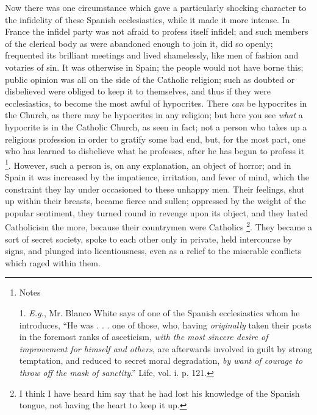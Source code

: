 Now there was one circumstance which gave a
particularly shocking character to the infidelity of
these Spanish ecclesiastics, while it made it more
intense. In France the infidel party was not afraid to
profess itself infidel; and such members of the clerical
body as were abandoned enough to join it, did so openly;
frequented its brilliant meetings and lived shamelessly,
like men of fashion and votaries of sin. It was otherwise
in Spain; the people would not have borne this; public
opinion was all on the side of the Catholic religion;
such as doubted or disbelieved were obliged to keep it to
themselves, and thus if they were ecclesiastics, to
become the most awful of hypocrites. There \emph{can}
be hypocrites in the Church, as there may be hypocrites
in any religion; but here you see \emph{what} a
hypocrite is in the Catholic Church, as seen in fact; not
a person who takes up a religious profession in order to
gratify some bad end, but, for the most part, one who has
learned to disbelieve what he professes, after he has
begun to profess it \footnote{Notes

1. \emph{E.g.}, Mr. Blanco White
says of one of the Spanish ecclesiastics whom he
introduces, ``He was . . . one of those, who, having \emph{originally}
taken their posts in the foremost ranks of asceticism, \emph{with
the most sincere desire of improvement for himself and
others}, are afterwards involved in guilt by strong
temptation, and reduced to secret moral degradation, \emph{by
want of courage to throw off the mask of sanctity}.''
Life, vol. i. p. 121.}. However, such a person is, on
any explanation, an object of horror; and in Spain it was
increased by the impatience, irritation, and fever of
mind, which the constraint they lay under occasioned to
these unhappy men. Their feelings, shut up within their
breasts, became fierce and sullen; oppressed by the
weight of the popular sentiment, they turned round in
revenge upon its object, and they hated Catholicism the
more, because their countrymen were Catholics \footnote{I think I have heard him say
that he had lost his knowledge of the Spanish tongue, not
having the heart to keep it up.}. They
became a sort of secret society, spoke to each other only
in private, held intercourse by signs, and plunged into
licentiousness, even as a relief to the miserable
conflicts which raged within them.

